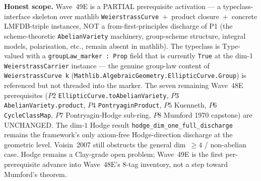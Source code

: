 \begin{remark}
\textbf{Honest scope.} Wave~49E is a PARTIAL prerequisite activation --- a typeclass-interface skeleton over mathlib \texttt{WeierstrassCurve}~$+$~product closure~$+$~concrete LMFDB-triple instances, NOT a from-first-principles discharge of P1 (the scheme-theoretic \texttt{AbelianVariety} machinery, group-scheme structure, integral models, polarisation, etc., remain absent in mathlib). The typeclass is Type-valued with a \texttt{groupLaw\_marker : Prop} field that is currently \texttt{True} at the dim-1 \texttt{WeierstrassCarrier} instance --- the genuine group-law content of \texttt{WeierstrassCurve k} (\texttt{Mathlib.AlgebraicGeometry.EllipticCurve.Group}) is referenced but not threaded into the marker. The seven remaining Wave~48E prerequisites ($P2$ \texttt{EllipticCurve.toAbelianVariety}, $P3$ \texttt{AbelianVariety.product}, $P4$ \texttt{PontryaginProduct}, $P5$ Kuenneth, $P6$ \texttt{CycleClassMap}, $P7$ Pontryagin-Hodge sub-ring, $P8$ Mumford 1970 capstone) are UNCHANGED. The dim-$1$ Hodge result \texttt{hodge\_dim\_one\_full\_discharge} remains the framework's only axiom-free Hodge-direction discharge at the geometric level. Voisin~2007 still obstructs the general dim~$\geq 4$ / non-abelian case. Hodge remains a Clay-grade open problem; Wave~49E is the first per-prerequisite advance into Wave~48E's 8-tag inventory, not a step toward Mumford's theorem.
\end{remark}

